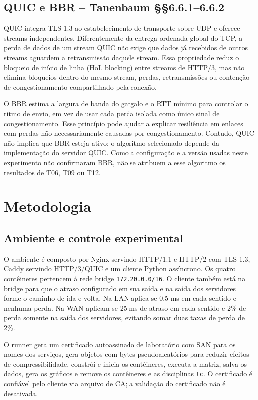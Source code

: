 \documentclass[12pt,a4paper]{article}
\begin{document}
\subsection{QUIC e BBR -- Tanenbaum \S\S 6.6.1--6.6.2}

QUIC integra TLS 1.3 ao estabelecimento de transporte sobre UDP e oferece streams
independentes. Diferentemente da entrega ordenada global do TCP, a perda de dados de um
stream QUIC não exige que dados já recebidos de outros streams aguardem a retransmissão
daquele stream. Essa propriedade reduz o bloqueio de início de linha (HoL blocking) entre
streams de HTTP/3, mas não elimina bloqueios dentro do mesmo stream, perdas, retransmissões
ou contenção de congestionamento compartilhado pela conexão.

O BBR estima a largura de banda do gargalo e o RTT mínimo para controlar o ritmo de envio,
em vez de usar cada perda isolada como único sinal de congestionamento. Esse princípio pode
ajudar a explicar resiliência em enlaces com perdas não necessariamente causadas por
congestionamento. Contudo, QUIC não implica que BBR esteja ativo: o algoritmo selecionado
depende da implementação do servidor QUIC. Como a configuração e a versão usadas neste
experimento não confirmaram BBR, não se atribuem a esse algoritmo os resultados de T06,
T09 ou T12.

\section{Metodologia}

\subsection{Ambiente e controle experimental}

O ambiente é composto por Nginx servindo HTTP/1.1 e HTTP/2 com TLS 1.3, Caddy servindo
HTTP/3/QUIC e um cliente Python assíncrono. Os quatro contêineres pertencem à rede bridge
\texttt{172.20.0.0/16}. O cliente também está na bridge para que o atraso configurado em sua
saída e na saída dos servidores forme o caminho de ida e volta. Na LAN aplica-se 0,5 ms em
cada sentido e nenhuma perda. Na WAN aplicam-se 25 ms de atraso em cada sentido e 2\% de
perda somente na saída dos servidores, evitando somar duas taxas de perda de 2\%.

O runner gera um certificado autoassinado de laboratório com SAN para os nomes dos serviços,
gera objetos com bytes pseudoaleatórios para reduzir efeitos de compressibilidade, constrói
e inicia os contêineres, executa a matriz, salva os dados, gera os gráficos e remove os
contêineres e as disciplinas \texttt{tc}. O certificado é confiável pelo cliente via arquivo
de CA; a validação do certificado não é desativada.
\end{document}
